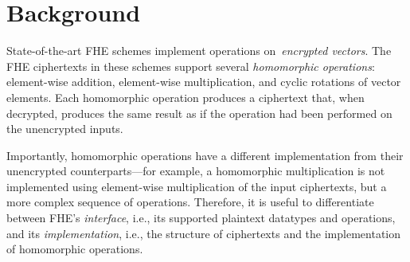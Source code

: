 \section{Background}\label{sec:background}




State-of-the-art %
FHE schemes implement operations on~\emph{encrypted vectors}.
The FHE ciphertexts in these schemes support several \emph{homomorphic operations}:
element-wise addition, element-wise multiplication, and cyclic rotations of vector elements.
Each homomorphic operation produces a ciphertext that, when decrypted,
produces the same result as if the operation had been performed on the unencrypted inputs.

Importantly, homomorphic operations have a different implementation from their unencrypted counterparts---for example,
a homomorphic multiplication is not implemented using element-wise multiplication
of the input ciphertexts, but a more complex
sequence of operations. Therefore, it is useful to differentiate between FHE's \emph{interface},
i.e., its supported plaintext datatypes and operations,
and its \emph{implementation},
i.e., the structure of ciphertexts and the implementation of homomorphic operations.

